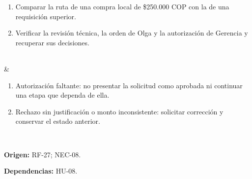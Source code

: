 \documentclass[12pt,letterpaper]{article}
\begin{document}
{\begin{enumerate}[nosep,leftmargin=*]
\item Comparar la ruta de una compra local de \$250.000 COP con la de una requisición superior.
\item Verificar la revisión técnica, la orden de Olga y la autorización de Gerencia y recuperar sus decisiones.
\end{enumerate}\\\hline
{} & \begin{enumerate}[nosep,leftmargin=*]
\item Autorización faltante: no presentar la solicitud como aprobada ni continuar una etapa que dependa de ella.
\item Rechazo sin justificación o monto inconsistente: solicitar corrección y conservar el estado anterior.
\end{enumerate}\\\hline
}
{\textbf{Origen:} RF-27; NEC-08.\par
\textbf{Dependencias:} HU-08.}
\end{document}
